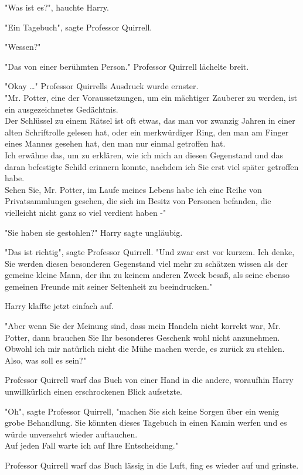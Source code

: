 {"Was ist es?", hauchte Harry.

"Ein Tagebuch", sagte Professor Quirrell.

"Wessen?"

"Das von einer berühmten Person." Professor Quirrell lächelte breit.

"Okay …" Professor Quirrells Ausdruck wurde ernster.\\ "Mr. Potter, eine der Voraussetzungen, um ein mächtiger Zauberer zu werden, ist ein ausgezeichnetes Gedächtnis.\\ Der Schlüssel zu einem Rätsel ist oft etwas, das man vor zwanzig Jahren in einer alten Schriftrolle gelesen hat, oder ein merkwürdiger Ring, den man am Finger eines Mannes gesehen hat, den man nur einmal getroffen hat.\\ Ich erwähne das, um zu erklären, wie ich mich an diesen Gegenstand und das daran befestigte Schild erinnern konnte, nachdem ich Sie erst viel später getroffen habe.\\ Sehen Sie, Mr. Potter, im Laufe meines Lebens habe ich eine Reihe von Privatsammlungen gesehen, die sich im Besitz von Personen befanden, die vielleicht nicht ganz so viel verdient haben -"

"Sie haben sie gestohlen?" Harry sagte ungläubig.

"Das ist richtig", sagte Professor Quirrell. "Und zwar erst vor kurzem. Ich denke, Sie werden diesen besonderen Gegenstand viel mehr zu schätzen wissen als der gemeine kleine Mann, der ihn zu keinem anderen Zweck besaß, als seine ebenso gemeinen Freunde mit seiner Seltenheit zu beeindrucken."

Harry klaffte jetzt einfach auf.

"Aber wenn Sie der Meinung sind, dass mein Handeln nicht korrekt war, Mr. Potter, dann brauchen Sie Ihr besonderes Geschenk wohl nicht anzunehmen. Obwohl ich mir natürlich nicht die Mühe machen werde, es zurück zu stehlen. Also, was soll es sein?"

Professor Quirrell warf das Buch von einer Hand in die andere, woraufhin Harry unwillkürlich einen erschrockenen Blick aufsetzte.

"Oh", sagte Professor Quirrell, "machen Sie sich keine Sorgen über ein wenig grobe Behandlung. Sie könnten dieses Tagebuch in einen Kamin werfen und es würde unversehrt wieder auftauchen.\\ Auf jeden Fall warte ich auf Ihre Entscheidung."

Professor Quirrell warf das Buch lässig in die Luft, fing es wieder auf und grinste.

}
